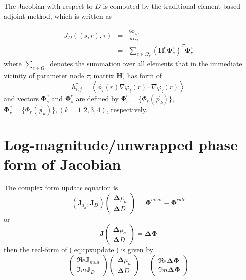 \documentclass{article}
\begin{document}
The Jacobian with respect to $D$ is computed by the traditional
element-based adjoint method, which is written as

\begin{eqnarray}\nonumber
J_{D}((s,r),\tau)&=&\frac{\partial
\Phi_{s,r}}{dD_{\tau}}\\&=&\sum_{e\in\Omega_\tau}\left(\mathbf{H}_\tau^e{\boldsymbol\Phi}_s^e\right)^T{\boldsymbol\Phi}_r^e
\end{eqnarray}
where $\sum_{e\in\Omega_\tau}$ denotes the summation over all
elements that in the immediate vicinity of parameter node $\tau$;
matrix $\mathbf{H}_\tau^e$ has form of
\begin{equation}
h^\tau_{i,j}=\left\langle
\phi_\tau(r)\nabla\varphi_i(r)\cdot\nabla\varphi_j(r)\right\rangle
\end{equation}
and vectors $\boldsymbol{\Phi}_s^e$ and $\boldsymbol{\Phi}_s^e$
are defined by $\boldsymbol{\Phi}_s^e=\{\Phi_s(\vec{p}_k)\}$,
$\boldsymbol{\Phi}_r^e=\{\Phi_r(\vec{p}_k)\}, (k=1,2,3,4)$,
respectively.

\section{Log-magnitude/unwrapped phase form of Jacobian}
The complex form update equation is
\begin{equation}
\left(\mathbf{J}_{\mu_a},\mathbf{J}_{D}\right)\left(
\begin{array}{l}
\boldsymbol{\Delta}{\mu_a}\\
\boldsymbol{\Delta}{D}
\end{array}
\right)=\boldsymbol{\Phi}^{meas}-\boldsymbol{\Phi}^{calc}
\end{equation}
or
\begin{equation}
\label{eq:cpxupdate} \mathbf{J}\left(
\begin{array}{l}
\boldsymbol{\Delta}{\mu_a}\\
\boldsymbol{\Delta}{D}
\end{array}
\right)=\boldsymbol{\Delta}\boldsymbol{\Phi}
\end{equation}
then the real-form of (\ref{eq:cpxupdate}) is given by
\begin{equation}
\label{eq:realupdate}\left(
\begin{array}{l}
\Re e{\mathbf{J}}_{mua}\\
\Im m{\mathbf{J}}_{D}
\end{array}\right)
\left(
\begin{array}{l}
\boldsymbol{\Delta}{\mu_a}\\
\boldsymbol{\Delta}{D}
\end{array}
\right)=\left(
\begin{array}{l}
\Re e{\boldsymbol{\Delta\Phi}}\\
\Im m{\boldsymbol{\Delta\Phi}}
\end{array}\right)
\end{equation}
\end{document}
